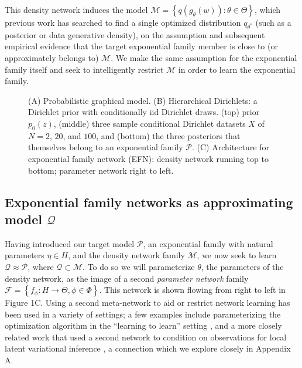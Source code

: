 \documentclass{article}
\newcommand{\inputTikZ}[2]{%
     \scalebox{#1}{}  
}
\begin{document}
This density network induces the model $\mathcal{M} = \left\{ q(g_\theta(w)) : \theta \in \Theta \right\}$, which previous work has searched to find a single optimized distribution $q_{\theta^*}$ (such as a posterior or data generative density), on the assumption and subsequent empirical evidence that the target exponential family member is close to (or approximately belongs to) $\mathcal{M}$.   We make the same assumption for the exponential family itself and seek to intelligently restrict $\mathcal{M}$ in order to learn the exponential family.  
\begin{figure}
 {\hspace{-.55cm} \inputTikZ{0.6}{figs/fig1/efn1b.tex}  }
  \caption{(A) Probabilistic graphical model. (B) Hierarchical Dirichlets: a Dirichlet prior with conditionally iid Dirichlet draws.  (top) prior $p_0(z)$, (middle) three sample conditional Dirichlet datasets $X$ of $N=2$, $20$, and $100$, and (bottom) the three posteriors that themselves belong to an exponential family $\mathcal{P}$.  (C) Architecture for exponential family network (EFN): density network running top to bottom; parameter network right to left.} \vspace{-.2in}
\end{figure}

\subsection{Exponential family networks as approximating model $\mathcal{Q}$}

Having introduced our target model $\mathcal{P}$, an exponential family with natural parameters $\eta \in H$, and the density network family $\mathcal{M}$, we now seek to learn $\mathcal{Q} \approx \mathcal{P}$, where $\mathcal{Q} \subset \mathcal{M}$.  
To do so we will parameterize $\theta$, the parameters of the density network, as the image of a second \emph{parameter network} family $\mathcal{F} = \left\{ f_\phi : H \rightarrow \Theta, \phi \in \Phi\right\}$.   
This network is shown flowing from right to left in Figure 1C.  
Using a second meta-network to aid or restrict network learning has been used in a variety of settings; a few examples include parameterizing the optimization algorithm in the ``learning to learn'' setting \citep{andrychowicz2016learning}, and a more closely related work that used a second network to condition on observations for local latent variational inference \citep{rezende2015variational}, a connection which we explore closely in Appendix A.
\end{document}
